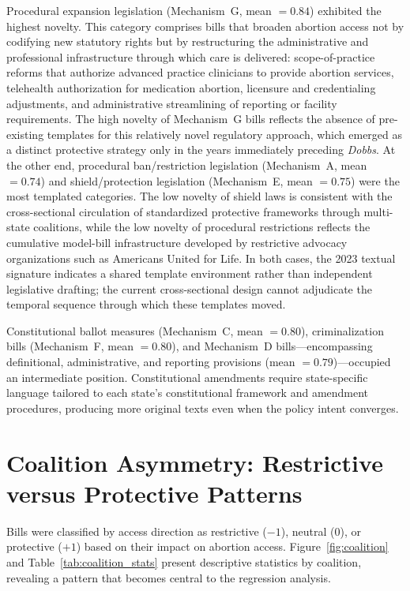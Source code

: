 Procedural expansion legislation (Mechanism~G, mean $= 0.84$) exhibited the highest novelty. This category comprises bills that broaden abortion access not by codifying new statutory rights but by restructuring the administrative and professional infrastructure through which care is delivered: scope-of-practice reforms that authorize advanced practice clinicians to provide abortion services, telehealth authorization for medication abortion, licensure and credentialing adjustments, and administrative streamlining of reporting or facility requirements. The high novelty of Mechanism~G bills reflects the absence of pre-existing templates for this relatively novel regulatory approach, which emerged as a distinct protective strategy only in the years immediately preceding \textit{Dobbs}. At the other end, procedural ban/restriction legislation (Mechanism~A, mean $= 0.74$) and shield/protection legislation (Mechanism~E, mean $= 0.75$) were the most templated categories. The low novelty of shield laws is consistent with the cross-sectional circulation of standardized protective frameworks through multi-state coalitions, while the low novelty of procedural restrictions reflects the cumulative model-bill infrastructure developed by restrictive advocacy organizations such as Americans United for Life. In both cases, the 2023 textual signature indicates a shared template environment rather than independent legislative drafting; the current cross-sectional design cannot adjudicate the temporal sequence through which these templates moved.

Constitutional ballot measures (Mechanism~C, mean $= 0.80$), criminalization bills (Mechanism~F, mean $= 0.80$), and Mechanism~D bills---encompassing definitional, administrative, and reporting provisions (mean $= 0.79$)---occupied an intermediate position. Constitutional amendments require state-specific language tailored to each state's constitutional framework and amendment procedures, producing more original texts even when the policy intent converges.

\section{Coalition Asymmetry: Restrictive versus Protective Patterns}
\label{sec:coalition_asymmetry}
Bills were classified by access direction as restrictive ($-1$), neutral ($0$), or protective ($+1$) based on their impact on abortion access. Figure~\ref{fig:coalition} and Table~\ref{tab:coalition_stats} present descriptive statistics by coalition, revealing a pattern that becomes central to the regression analysis.

